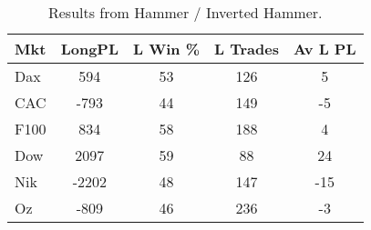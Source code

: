 \begin{table}[ht]
\centering
\caption[Hammer System]{Results from Hammer / Inverted Hammer.} 
\label{tab:hammer_results}
\begin{tabular}{lcccc}
  \toprule Mkt & LongPL & L Win \% & L Trades & Av L PL \\ 
  \midrule Dax & 594 & 53 & 126 & 5 \\ 
  CAC & -793 & 44 & 149 & -5 \\ 
  F100 & 834 & 58 & 188 & 4 \\ 
  Dow & 2097 & 59 & 88 & 24 \\ 
  Nik & -2202 & 48 & 147 & -15 \\ 
  Oz & -809 & 46 & 236 & -3 \\ 
   \bottomrule \end{tabular}
\end{table}
